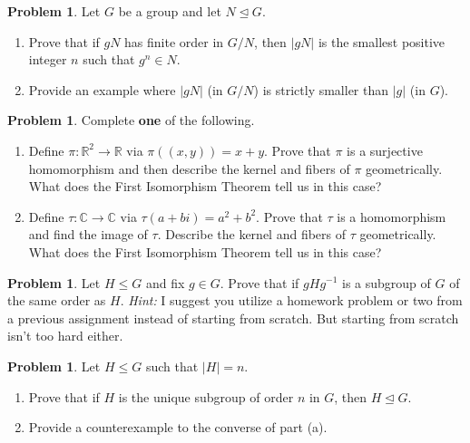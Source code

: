 \documentclass[11pt]{scrartcl}
\theoremstyle{definition}
\newtheorem{problem}[theorem]{Problem}
\begin{document}
\begin{problem}
Let $G$ be a group and let $N\unlhd G$. 
\begin{enumerate}[label=\rm{(\alph*)}]
\item Prove that if $gN$ has finite order in $G/N$, then $|gN|$ is the smallest positive integer $n$ such that $g^n\in N$.
\item Provide an example where $|gN|$ (in $G/N$) is strictly smaller than $|g|$ (in $G$).
\end{enumerate}
\end{problem}

\newpage

\begin{problem}
Complete \textbf{one} of the following.
\begin{enumerate}[label=\rm{(\alph*)}]
\item Define $\pi:\mathbb{R}^2\to \mathbb{R}$ via $\pi((x,y))=x+y$.  Prove that $\pi$ is a surjective homomorphism and then describe the kernel and fibers of $\pi$ geometrically.  What does the First Isomorphism Theorem tell us in this case?
\item Define $\tau:\mathbb{C}\to\mathbb{C}$ via $\tau(a+bi)=a^2+b^2$. Prove that $\tau$ is a homomorphism and find the image of $\tau$.  Describe the kernel and fibers of $\tau$ geometrically.  What does the First Isomorphism Theorem tell us in this case?
\end{enumerate}
\end{problem}

\begin{problem}
Let $H\leq G$ and fix $g\in G$. Prove that if $gHg^{-1}$ is a subgroup of $G$ of the same order as $H$. \emph{Hint:} I suggest you utilize a homework problem or two from a previous assignment instead of starting from scratch.  But starting from scratch isn't too hard either.
\end{problem}

\begin{problem}
Let $H\leq G$ such that $|H|=n$. 
\begin{enumerate}[label=\rm{(\alph*)}]
\item Prove that if $H$ is the unique subgroup of order $n$ in $G$, then $H\unlhd G$.
\item Provide a counterexample to the converse of part (a).
\end{enumerate}
\end{problem}
\end{document}
